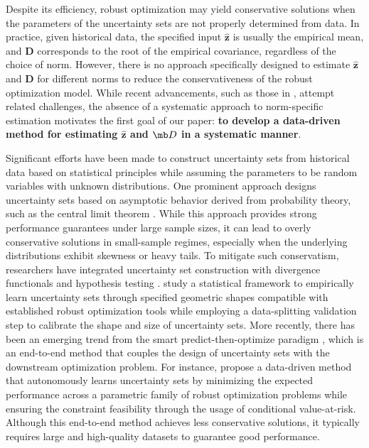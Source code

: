 \documentclass[mnsc, nonblindrev]{informswp}
\newcommand{\1}[1]{\mathds{1}{\left(#1\right)}}
\begin{document}

Despite its efficiency, robust optimization may yield conservative solutions when the parameters of the uncertainty sets are not properly determined from data. In practice, given historical data, the specified input \( \bm{\hat{z}} \) is usually the empirical mean, and \( \mathbf{D} \) corresponds to the root of the empirical covariance, regardless of the choice of norm. However, there is no approach specifically designed to estimate \( \bm{\hat{z}} \) and \( \mathbf{D} \) for different norms to reduce the conservativeness of the robust optimization model. While recent advancements, such as those in \cite{wang2023learning}, attempt related challenges, the absence of a systematic approach to norm-specific estimation motivates the first goal of our paper: {\bf to develop a data-driven method for estimating \( \bm{\hat{z}} \) and \( \mb D \) in a systematic manner}.

Significant efforts have been made to construct uncertainty sets from historical data based on statistical principles while assuming the parameters to be random variables with unknown distributions. One prominent approach designs uncertainty sets based on asymptotic behavior derived from probability theory, such as the central limit theorem \citep{bandi2012tractable}. While this approach provides strong performance guarantees under large sample sizes, it can lead to overly conservative solutions in small-sample regimes, especially when the underlying distributions exhibit skewness or heavy tails.
To mitigate such conservatism, researchers have integrated uncertainty set construction with divergence functionals \citep{ben2013robust} and hypothesis testing \citep{Bertsimas_Gupta_Kallus_2018data}.
\cite{hong2021learning} study a statistical framework to empirically learn uncertainty sets through specified geometric shapes compatible with established robust optimization tools while employing a data-splitting validation step to calibrate the shape and size of uncertainty sets. More recently, there has been an emerging trend from the smart predict-then-optimize paradigm \citep{Elmachtoub_Grigas_2021smart}, which is an end-to-end method that couples the design of uncertainty sets with the downstream optimization problem. For instance, \cite{wang2023learning} propose a data-driven method that autonomously learns uncertainty sets by minimizing the expected performance across a parametric family of robust optimization problems while ensuring the constraint feasibility through the usage of conditional value-at-risk. Although this end-to-end method achieves less conservative solutions, it typically requires large and high-quality datasets to guarantee good performance.
\end{document}
